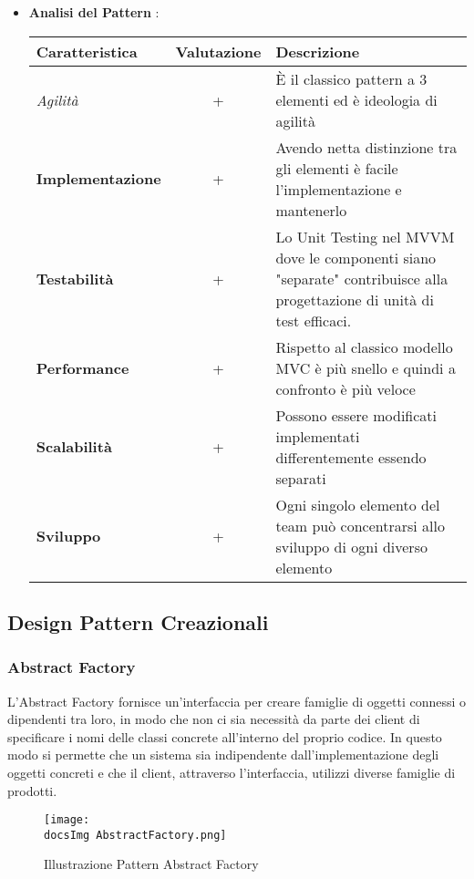 {{{\begin{itemize}
				\item \textbf{Analisi del Pattern} :
				\small %
				{\renewcommand\arraystretch{1.2} %
					\begin{tabular}{|l|c|l|}
						\hline
						{\textbf{Caratteristica}}&{\textbf{Valutazione}}&{\textbf{Descrizione}}\\
						\hline
						\textit{Agilità} & + & È il classico pattern a 3 elementi ed è ideologia di agilità \\
						\hline
						\textbf{Implementazione} & + & Avendo netta distinzione tra gli elementi è facile l'implementazione e mantenerlo\\
						\hline
						\textbf{Testabilità} & + & Lo Unit Testing nel MVVM dove le componenti siano "separate" contribuisce alla progettazione di unità di test efficaci.\\
						\hline
						\textbf{Performance} & + & Rispetto al classico modello MVC è più snello e quindi a confronto è più veloce \\
						\hline
						\textbf{Scalabilità} & + & Possono essere modificati implementati differentemente essendo separati\\
						\hline
						\textbf{Sviluppo} & + & Ogni singolo elemento del team può concentrarsi allo sviluppo di ogni diverso elemento \\
						\hline
					\end{tabular}
				}
			\end{itemize}
		}
	}
	\subsection{Design Pattern Creazionali}{
		\subsubsection{Abstract Factory}{
			L'Abstract Factory fornisce un'interfaccia per creare famiglie di oggetti connessi o dipendenti tra loro, in modo che non ci sia necessità da parte dei client di specificare i nomi delle classi concrete all'interno del proprio codice.
			In questo modo si permette che un sistema sia indipendente dall'implementazione degli oggetti concreti e che il client, attraverso l'interfaccia, utilizzi diverse famiglie di prodotti.
			
			\begin{figure}[ht]
				\centering
				\texttt{[image: \\docsImg AbstractFactory.png]}
				\caption{Illustrazione Pattern Abstract Factory}
				\label{Illustrazione Pattern Abstract Factory}
			\end{figure}
			
}}}
